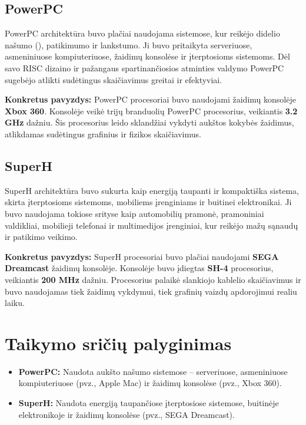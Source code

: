 \documentclass{article}
\begin{document}
\subsection{PowerPC}
PowerPC architektūra buvo plačiai naudojama sistemose, kur reikėjo didelio našumo (\citealp{IBM2024}), patikimumo ir lankstumo. Ji buvo pritaikyta serveriuose, asmeniniuose kompiuteriuose, žaidimų konsolėse ir įterptosioms sistemoms. Dėl savo RISC dizaino ir pažangaus spartinančiosios atminties valdymo PowerPC sugebėjo atlikti sudėtingus skaičiavimus greitai ir efektyviai.

\textbf{Konkretus pavyzdys:} PowerPC procesoriai buvo naudojami žaidimų konsolėje \textbf{Xbox 360}. Konsolėje veikė trijų branduolių PowerPC procesorius, veikiantis \textbf{3.2 GHz} dažniu. Šis procesorius leido sklandžiai vykdyti aukštos kokybės žaidimus, atlikdamas sudėtingus grafinius ir fizikos skaičiavimus.

\subsection{SuperH}
SuperH architektūra buvo sukurta kaip energiją taupanti ir kompaktiška sistema, skirta įterptosioms sistemoms, mobiliems įrenginiams ir buitinei elektronikai. Ji buvo naudojama tokiose srityse kaip automobilių pramonė, pramoniniai valdikliai, mobilieji telefonai ir multimedijos įrenginiai, kur reikėjo mažų sąnaudų ir patikimo veikimo.

\textbf{Konkretus pavyzdys:} SuperH procesoriai buvo plačiai naudojami \textbf{SEGA Dreamcast} žaidimų konsolėje. Konsolėje buvo įdiegtas \textbf{SH-4} procesorius, veikiantis \textbf{200 MHz} dažniu. Procesorius palaikė slankiojo kablelio skaičiavimus ir buvo naudojamas tiek žaidimų vykdymui, tiek grafinių vaizdų apdorojimui realiu laiku.

\section*{Taikymo sričių palyginimas}
\begin{itemize}
    \item \textbf{PowerPC:} Naudota aukšto našumo sistemose – serveriuose, asmeniniuose kompiuteriuose (pvz., Apple Mac) ir žaidimų konsolėse (pvz., Xbox 360).
    \item \textbf{SuperH:} Naudota energiją taupančiose įterptosiose sistemose, buitinėje elektronikoje ir žaidimų konsolėse (pvz., SEGA Dreamcast).
\end{itemize}
\end{document}
